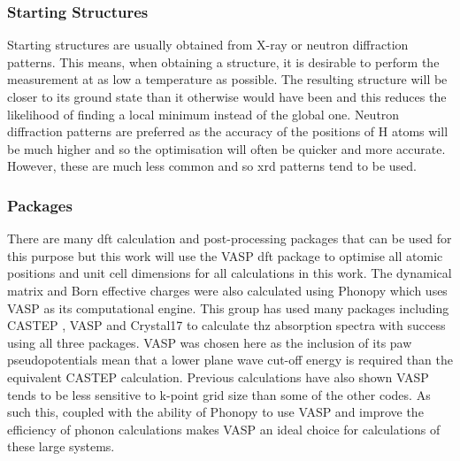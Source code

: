 \subsubsection{Starting Structures}
Starting structures are usually obtained from X-ray or neutron diffraction patterns. This means, when obtaining a structure, it is desirable to perform the measurement at as low a temperature as possible. The resulting structure will be closer to its ground state than it otherwise would have been and this reduces the likelihood of finding a local minimum instead of the global one. Neutron diffraction patterns are preferred as the accuracy of the positions of H atoms will be much higher and so the optimisation will often be quicker and more accurate. However, these are much less common and so \acrfull{xrd} patterns tend to be used. 

\subsubsection{Packages}
There are many \acrshort{dft} calculation and post-processing packages that can be used for this purpose \DIFdelbegin \DIFdel{~}\DIFdelend \cite{Clark2005, Gale2011, dovesi2020crystal} but this work will use the VASP \DIFdelbegin \DIFdel{~}\DIFdelend \cite{Hafner2008} \acrshort{dft} package to optimise all atomic positions and unit cell dimensions for all calculations in this work. The dynamical matrix and Born effective charges were also calculated using Phonopy \DIFdelbegin \DIFdel{~}\DIFdelend \cite{Togo2015} which uses VASP as its computational engine. This group has used many packages including CASTEP \DIFdelbegin \DIFdel{~}\DIFdelend \cite{Clark2005}, VASP and Crystal17 to calculate \acrshort{thz} absorption spectra with success using all three packages. VASP was chosen here as the inclusion of its \acrshort{paw} pseudopotentials mean that a lower plane wave cut\nobreakdash-off energy is required than the equivalent CASTEP calculation. Previous calculations have also shown VASP tends to be less sensitive to k\nobreakdash-point grid size than some of the other codes. As such this, coupled with the ability of Phonopy to use VASP and improve the efficiency of phonon calculations makes VASP an ideal choice for calculations of these large systems.


